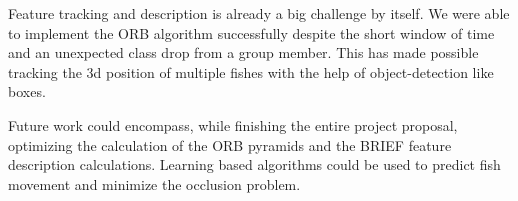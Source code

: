\documentclass[conference]{IEEEtran}
\begin{document}
Feature tracking and description is already a big challenge by itself. We were able to implement the ORB algorithm successfully despite the short window of time and an unexpected class drop from a group member. This has made possible tracking the 3d position of multiple fishes with the help of object-detection like boxes. 

Future work could encompass, while finishing the entire project proposal, optimizing the calculation of the ORB pyramids and the BRIEF feature description calculations. Learning based algorithms could be used to predict fish movement and minimize the occlusion problem.




\footnotesize{}
\end{document}
